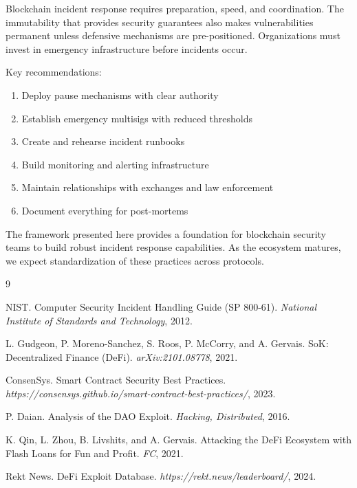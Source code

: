 \documentclass[11pt,a4paper]{article}
\theoremstyle{definition}
\begin{document}
Blockchain incident response requires preparation, speed, and coordination. The immutability that provides security guarantees also makes vulnerabilities permanent unless defensive mechanisms are pre-positioned. Organizations must invest in emergency infrastructure before incidents occur.

Key recommendations:
\begin{enumerate}
    \item Deploy pause mechanisms with clear authority
    \item Establish emergency multisigs with reduced thresholds
    \item Create and rehearse incident runbooks
    \item Build monitoring and alerting infrastructure
    \item Maintain relationships with exchanges and law enforcement
    \item Document everything for post-mortems
\end{enumerate}

The framework presented here provides a foundation for blockchain security teams to build robust incident response capabilities. As the ecosystem matures, we expect standardization of these practices across protocols.


\begin{thebibliography}{9}

NIST.
Computer Security Incident Handling Guide (SP 800-61).
\textit{National Institute of Standards and Technology}, 2012.

L. Gudgeon, P. Moreno-Sanchez, S. Roos, P. McCorry, and A. Gervais.
SoK: Decentralized Finance (DeFi).
\textit{arXiv:2101.08778}, 2021.

ConsenSys.
Smart Contract Security Best Practices.
\textit{https://consensys.github.io/smart-contract-best-practices/}, 2023.

P. Daian.
Analysis of the DAO Exploit.
\textit{Hacking, Distributed}, 2016.

K. Qin, L. Zhou, B. Livshits, and A. Gervais.
Attacking the DeFi Ecosystem with Flash Loans for Fun and Profit.
\textit{FC}, 2021.

Rekt News.
DeFi Exploit Database.
\textit{https://rekt.news/leaderboard/}, 2024.

\end{thebibliography}
\end{document}
